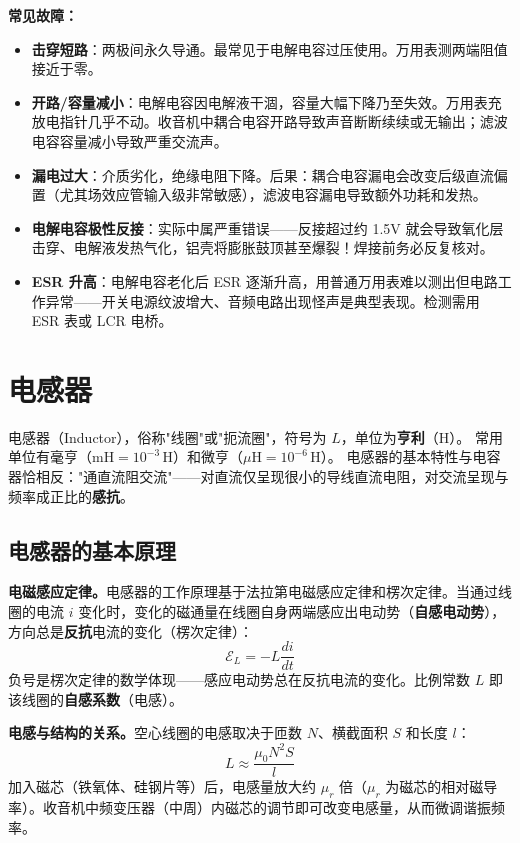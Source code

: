 \documentclass[12pt,UTF8]{ctexbook}
\begin{document}
\textbf{常见故障：}
\begin{itemize}
  \item \textbf{击穿短路}：两极间永久导通。最常见于电解电容过压使用。万用表测两端阻值接近于零。
  \item \textbf{开路/容量减小}：电解电容因电解液干涸，容量大幅下降乃至失效。万用表充放电指针几乎不动。收音机中耦合电容开路导致声音断断续续或无输出；滤波电容容量减小导致严重交流声。
  \item \textbf{漏电过大}：介质劣化，绝缘电阻下降。后果：耦合电容漏电会改变后级直流偏置（尤其场效应管输入级非常敏感），滤波电容漏电导致额外功耗和发热。
  \item \textbf{电解电容极性反接}：实际中属严重错误——反接超过约 1.5V 就会导致氧化层击穿、电解液发热气化，铝壳将膨胀鼓顶甚至爆裂！焊接前务必反复核对。
  \item \textbf{ESR 升高}：电解电容老化后 ESR 逐渐升高，用普通万用表难以测出但电路工作异常——开关电源纹波增大、音频电路出现怪声是典型表现。检测需用 ESR 表或 LCR 电桥。
\end{itemize}

\section{电感器}
\label{sec:inductor}

电感器（Inductor），俗称"线圈"或"扼流圈"，符号为 $L$，单位为\textbf{亨利}（H）。
常用单位有毫亨（$\mathrm{mH}=10^{-3}\,\mathrm{H}$）和微亨（$\mu\mathrm{H}=10^{-6}\,\mathrm{H}$）。
电感器的基本特性与电容器恰相反："通直流阻交流"——对直流仅呈现很小的导线直流电阻，对交流呈现与频率成正比的\textbf{感抗}。

\subsection{电感器的基本原理}

\textbf{电磁感应定律。}电感器的工作原理基于法拉第电磁感应定律和楞次定律。当通过线圈的电流 $i$ 变化时，变化的磁通量在线圈自身两端感应出电动势（\textbf{自感电动势}），方向总是\textbf{反抗}电流的变化（楞次定律）：
\[
\mathcal{E}_L = -L\frac{di}{dt}
\]
负号是楞次定律的数学体现——感应电动势总在反抗电流的变化。比例常数 $L$ 即该线圈的\textbf{自感系数}（电感）。

\textbf{电感与结构的关系。}空心线圈的电感取决于匝数 $N$、横截面积 $S$ 和长度 $l$：
\[
L \approx \frac{\mu_0 N^2 S}{l}
\]
加入磁芯（铁氧体、硅钢片等）后，电感量放大约 $\mu_r$ 倍（$\mu_r$ 为磁芯的相对磁导率）。收音机中频变压器（中周）内磁芯的调节即可改变电感量，从而微调谐振频率。
\end{document}
